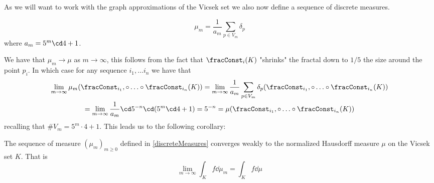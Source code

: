 As we will want to work with the graph approximations of the Vicsek set we also now define a sequence of discrete measures.
\begin{defi}
	\begin{equation}\label{discreteMeasures}
		\mu_m = \frac{1}{a_m} \sum_{p \in V_m} \delta_p
	\end{equation}
	where $a_m = 5^{m}\cd 4 + 1$. 
\end{defi}

We have that $\mu_m \to \mu$ as $m \to \infty$, this follows from the fact that $\fracConst_i(K)$ "shrinks" the fractal down to $1/5$ the size around the point $p_i$. In which case for any sequence $i_1, \ldots i_n$ we have that
\begin{multline}
	\lim_{m \to \infty} \mu_m(\fracConst_{i_1},\circ \ldots \circ \fracConst_{i_n}(K)) = \lim_{m \to \infty}\frac{1}{a_m} \sum_{p \in V_m} \delta_p(\fracConst_{i_1},\circ \ldots \circ \fracConst_{i_n}(K)) \\ 
	= \lim_{m \to \infty} \frac{1}{a_m} \cd 5^{-n} \cd (5^{m}\cd 4 +1) = 5^{-n} = \mu(\fracConst_{i_1},\circ \ldots \circ \fracConst_{i_n}(K))
\end{multline}
recalling that $\# V_m = 5^{m}\cdot 4 + 1$. This leads us to the following corollary:
\begin{coro}\label{convergenceOfMeasures}
	The sequence of measure $(\mu_m)_{m \geq 0}$ defined in \eqref{discreteMeasures} converges weakly to the normalized Hausdorff measure $\mu$ on the Vicsek set $K$. That is
	\begin{equation}
		\lim_{m \to \infty} \int_{K}f \dd \mu_m = \int_{K} f \dd \mu
	\end{equation}
\end{coro}
 